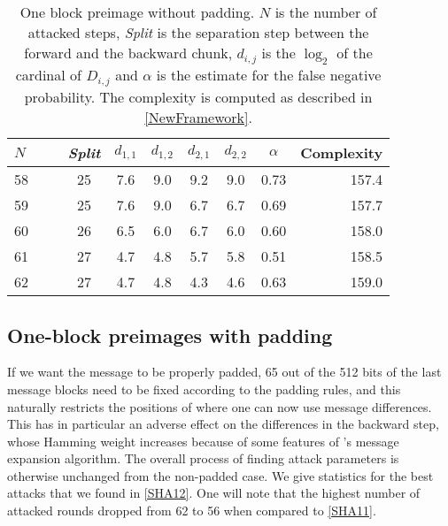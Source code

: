   \begin{table}[htb]
    \caption[One block preimage without padding.]{One block preimage without padding. $N$ is the 
              number of attacked steps, \emph{Split} is the separation step between the
              forward and the backward chunk, $d_{i,j}$ is the $\log_2$ of the cardinal
              of $D_{i,j}$ and $\alpha$ is the estimate for the false negative probability. The complexity
              is computed as described in  \autoref{NewFramework}.\label{SHA11}}
    \begin{center}
      \begin{tabular}{l c c c c c c r @{}} \toprule
        $N\qquad$ &  \emph{Split} & $d_{1,1}$ &  $d_{1,2}$ & $d_{2,1}$ & $d_{2,2}$ & $\alpha $ & Complexity \\\midrule
        58    & 25  & 7.6  & 9.0 & 9.2 & 9.0 & 0.73  & 157.4\\ 
        59    & 25  & 7.6  & 9.0 & 6.7 & 6.7  & 0.69  & 157.7\\ 
        60    & 26  & 6.5 & 6.0 & 6.7 & 6.0  & 0.60  & 158.0\\ 
        61    & 27  & 4.7 & 4.8 & 5.7  & 5.8  & 0.51  & 158.5\\ 
        62    & 27  & 4.7 & 4.8 & 4.3  & 4.6  & 0.63 & 159.0 \\ 
        \bottomrule
        \hline
      \end{tabular}
    \end{center}
  \end{table}

  \subsection{One-block preimages with padding}
\label{sec:one_wi_pad}


  If we want the message to be properly padded, 65 out of the 512 bits of the last message
  blocks need to be fixed according to the padding rules, and this naturally restricts the positions
  of where one can now use message differences. This has in particular an adverse effect on
  the differences in the backward step, whose Hamming weight increases because of some
  features of \shaone's message expansion algorithm. The overall process of finding attack
  parameters is otherwise unchanged from the non-padded case. We give statistics for
  the best attacks that we found in \autoref{SHA12}. One will note that the highest number of attacked
  rounds dropped from 62 to 56 when compared to \autoref{SHA11}.
 
